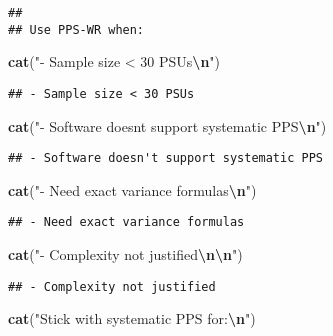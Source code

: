 \documentclass[
]{article}
\newenvironment{Shaded}{\begin{snugshade}}{\end{snugshade}}
\newcommand{\FunctionTok}[1]{\textcolor[rgb]{0.13,0.29,0.53}{\textbf{#1}}}
\newcommand{\NormalTok}[1]{#1}
\newcommand{\SpecialCharTok}[1]{\textcolor[rgb]{0.81,0.36,0.00}{\textbf{#1}}}
\newcommand{\StringTok}[1]{\textcolor[rgb]{0.31,0.60,0.02}{#1}}
\begin{document}
\begin{verbatim}
## 
## Use PPS-WR when:
\end{verbatim}

\begin{Shaded}
\begin{Highlighting}[]
\FunctionTok{cat}\NormalTok{(}\StringTok{"{-} Sample size \textless{} 30 PSUs}\SpecialCharTok{\textbackslash{}n}\StringTok{"}\NormalTok{)}
\end{Highlighting}
\end{Shaded}

\begin{verbatim}
## - Sample size < 30 PSUs
\end{verbatim}

\begin{Shaded}
\begin{Highlighting}[]
\FunctionTok{cat}\NormalTok{(}\StringTok{"{-} Software doesn\textquotesingle{}t support systematic PPS}\SpecialCharTok{\textbackslash{}n}\StringTok{"}\NormalTok{)}
\end{Highlighting}
\end{Shaded}

\begin{verbatim}
## - Software doesn't support systematic PPS
\end{verbatim}

\begin{Shaded}
\begin{Highlighting}[]
\FunctionTok{cat}\NormalTok{(}\StringTok{"{-} Need exact variance formulas}\SpecialCharTok{\textbackslash{}n}\StringTok{"}\NormalTok{)}
\end{Highlighting}
\end{Shaded}

\begin{verbatim}
## - Need exact variance formulas
\end{verbatim}

\begin{Shaded}
\begin{Highlighting}[]
\FunctionTok{cat}\NormalTok{(}\StringTok{"{-} Complexity not justified}\SpecialCharTok{\textbackslash{}n\textbackslash{}n}\StringTok{"}\NormalTok{)}
\end{Highlighting}
\end{Shaded}

\begin{verbatim}
## - Complexity not justified
\end{verbatim}

\begin{Shaded}
\begin{Highlighting}[]
\FunctionTok{cat}\NormalTok{(}\StringTok{"Stick with systematic PPS for:}\SpecialCharTok{\textbackslash{}n}\StringTok{"}\NormalTok{)}
\end{Highlighting}
\end{Shaded}
\end{document}

